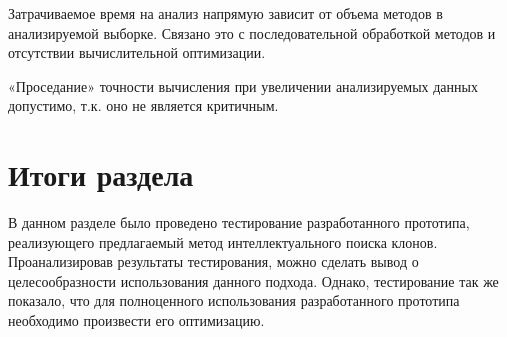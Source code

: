 Затрачиваемое время на анализ напрямую зависит от объема методов в анализируемой выборке. Связано это с последовательной обработкой методов и отсутствии вычислительной оптимизации.

«Проседание» точности вычисления при увеличении анализируемых данных допустимо, т.к. оно не является критичным.

\section{Итоги раздела}

В данном разделе было проведено тестирование разработанного прототипа, реализующего предлагаемый метод интеллектуального поиска клонов. Проанализировав результаты тестирования, можно сделать вывод о целесообразности использования данного подхода. Однако, тестирование так же показало, что для полноценного использования разработанного прототипа необходимо произвести его оптимизацию.
